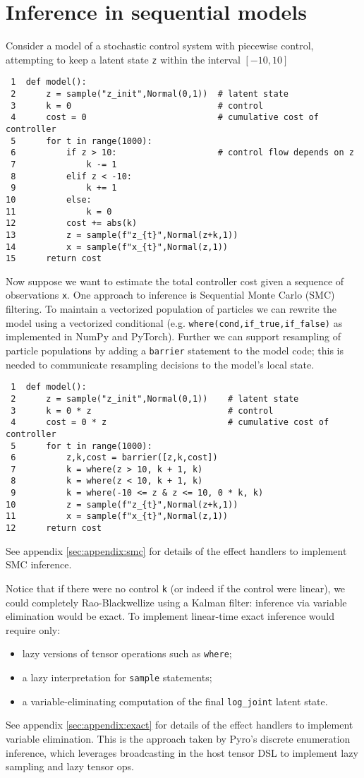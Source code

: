 \documentclass[anonymous=false, %
               format=acmsmall, %
               review=true, %
               screen=true, %
               nonacm=true]{acmart}
\begin{document}
\section{Inference in sequential models}

Consider a model of a stochastic control system with piecewise control, attempting to keep a latent state \verb$z$ within the interval $[-10,10]$
\begin{verbatim}
 1  def model():
 2      z = sample("z_init",Normal(0,1))  # latent state
 3      k = 0                             # control
 4      cost = 0                          # cumulative cost of controller
 5      for t in range(1000):
 6          if z > 10:                    # control flow depends on z
 7              k -= 1
 8          elif z < -10:
 9              k += 1
10          else:
11              k = 0
12          cost += abs(k)
13          z = sample(f"z_{t}",Normal(z+k,1))
14          x = sample(f"x_{t}",Normal(z,1))
15      return cost
\end{verbatim}
Now suppose we want to estimate the total controller cost given a sequence of observations \verb$x$.
One approach to inference is Sequential Monte Carlo (SMC) filtering.
To maintain a vectorized population of particles we can rewrite the model using a vectorized conditional (e.g. \verb$where(cond,if_true,if_false)$ as implemented in NumPy and PyTorch).
Further we can support resampling of particle populations by adding a \verb$barrier$ statement to the model code; this is needed to communicate resampling decisions to the model's local state.
\begin{verbatim}
 1  def model():
 2      z = sample("z_init",Normal(0,1))    # latent state
 3      k = 0 * z                           # control
 4      cost = 0 * z                        # cumulative cost of controller
 5      for t in range(1000):
 6          z,k,cost = barrier([z,k,cost])
 7          k = where(z > 10, k + 1, k)
 8          k = where(z < 10, k + 1, k)
 9          k = where(-10 <= z & z <= 10, 0 * k, k)
10          z = sample(f"z_{t}",Normal(z+k,1))
11          x = sample(f"x_{t}",Normal(z,1))
12      return cost
\end{verbatim}
See appendix \ref{sec:appendix:smc} for details of the effect handlers to implement SMC inference.

Notice that if there were no control \verb$k$ (or indeed if the control were linear), we could completely Rao-Blackwellize using a Kalman filter: inference via variable elimination would be exact.
To implement linear-time exact inference would require only:
\begin{itemize}
  \item lazy versions of tensor operations such as \verb$where$;
  \item a lazy interpretation for \verb$sample$ statements;
  \item a variable-eliminating computation of the final \verb$log_joint$ latent state.
\end{itemize}
See appendix \ref{sec:appendix:exact} for details of the effect handlers to implement variable elimination.
This is the approach taken by Pyro's discrete enumeration inference, which leverages broadcasting in the host tensor DSL to implement lazy sampling and lazy tensor ops.
\end{document}

